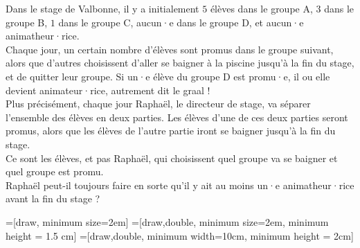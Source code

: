 Dans le stage de Valbonne, il y a initialement $5$ élèves dans le groupe A, $3$ dans le groupe B, $1$ dans le groupe C, aucun·e dans le groupe D, et aucun·e animatheur·rice.\\

Chaque jour, un certain nombre d'élèves sont promus dans le groupe suivant, alors que d'autres choisissent d'aller se baigner à la piscine jusqu'à la fin du stage, et de quitter leur groupe. Si un·e élève du groupe D est promu·e, il ou elle devient animateur·rice, autrement dit le graal !\\

Plus précisément, chaque jour Raphaël, le directeur de stage, va séparer l'ensemble des élèves en deux parties. Les élèves d'une de ces deux parties seront promus, alors que les élèves de l'autre partie iront se baigner jusqu'à la fin du stage.\\
Ce sont les élèves, et pas Raphaël, qui choisissent quel groupe va se baigner et quel groupe est promu.\\

Raphaël peut-il toujours faire en sorte qu'il y ait au moins un·e animatheur·rice avant la fin du stage ?

=[draw, minimum size=2em]
=[draw,double, minimum size=2em, minimum height = 1.5 cm]
=[draw,double, minimum width=10cm, minimum height = 2cm]

\begin{center}
\end{center}